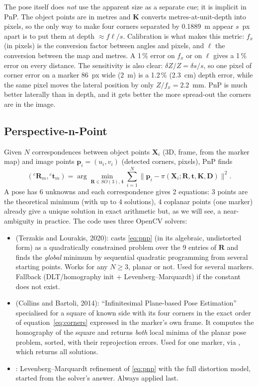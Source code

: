 The pose itself does \emph{not} use the apparent size as a separate cue; it is implicit in PnP. The object points are
in metres and $\mathbf K$ converts metres-at-unit-depth into pixels, so the only way to make four corners
separated by 0.1889~m appear $s$~px apart is to put them at depth $\approx f\ell/s$. Calibration is what makes this
metric: $f_x$ (in pixels) is the conversion factor between angles and pixels, and $\ell$ the conversion between the
map and metres. A 1\,\% error on $f_x$ or on $\ell$ gives a 1\,\% error on every distance. The sensitivity is also
clear: $\delta Z/Z = \delta s/s$, so one pixel of corner error on a marker 86~px wide (2~m) is a 1.2\,\% (2.3~cm)
depth error, while the same pixel moves the lateral position by only $Z/f_x = 2.2$~mm. PnP is much better laterally
than in depth, and it gets better the more spread-out the corners are in the image.

\subsection{Perspective-n-Point}

Given $N$ correspondences between object points $\mathbf X_i$ (3D,  frame, from the marker map) and image
points $\mathbf p_i=(u_i,v_i)$ (detected corners, pixels), PnP finds
\begin{equation}
({}^c\mathbf R_m,{}^c\mathbf t_m) = \arg\min_{\mathbf R\in SO(3),\,\mathbf t}
\sum_{i=1}^{N}\big\lVert \mathbf p_i - \pi(\mathbf X_i;\mathbf R,\mathbf t,\mathbf K,\mathbf D)\big\rVert^2 .
\label{eq:pnp}
\end{equation}
A pose has 6 unknowns and each correspondence gives 2 equations: 3 points are the theoretical minimum (with up to 4
solutions), 4 coplanar points (one marker) already give a unique solution in exact arithmetic but, as we will see, a
near-ambiguity in practice. The code uses three OpenCV solvers:
\begin{itemize}
\item {} (Terzakis and Lourakis, 2020): casts \eqref{eq:pnp} (in its algebraic, undistorted
  form) as a quadratically constrained problem over the 9 entries of $\mathbf R$ and finds the \emph{global} minimum by
  sequential quadratic programming from several starting points. Works for any $N\geq 3$, planar or not. Used for
  several markers. Fallback  (DLT/homography init + Levenberg--Marquardt) if the constant does
  not exist.
\item {} (Collins and Bartoli, 2014): ``Infinitesimal Plane-based Pose Estimation''
  specialised for a square of known side with its four corners in the exact order of equation~\eqref{eq:corners}
  expressed in the marker's own frame. It computes the homography of the square and returns \emph{both} local minima of
  the planar pose problem, sorted, with their reprojection errors. Used for one marker, via
  , which returns all solutions.
\item {}: Levenberg--Marquardt refinement of \eqref{eq:pnp} with the full distortion model,
  started from the solver's answer. Always applied last.
\end{itemize}


